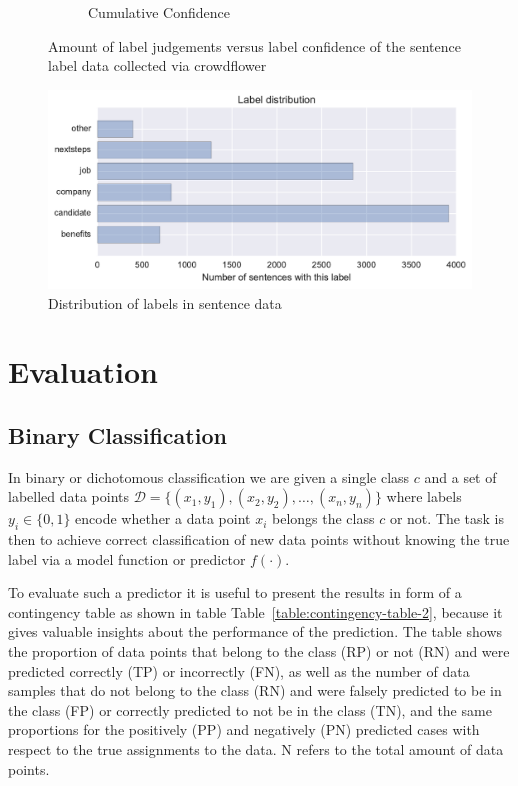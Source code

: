 \begin{figure}[h]
\begin{subfigure}[b]{0.43\textwidth}
        \caption{Cumulative Confidence}
        \label{fig:sentence-data-judgement-confidence-cumulative}
    \end{subfigure}
    \caption{Amount of label judgements versus label confidence of the sentence label data collected via crowdflower}
  \label{fig:sentence-data-judgements}
\end{figure}


\begin{figure}[h]
    \centering
    \includegraphics[width=\textwidth]{img/sentence-data-label-dist.pdf}
    \caption{Distribution of labels in sentence data}
  \label{fig:sentence-data-label-dist}
\end{figure}

\section{Evaluation}
\label{sec:evaluation}


\subsection{Binary Classification}
\label{sub:binary-classification}

In binary or dichotomous classification we are given a single class $c$ and a set of labelled data points $\mathcal{D} = \{ (x_1, y_1), (x_2, y_2), \ldots, (x_n, y_n) \}$ where labels $y_i \in \{0, 1\}$ encode whether a data point $x_i$ belongs the class $c$ or not. The task is then to achieve correct classification of new data points without knowing the true label via a model function or predictor $f(\cdot)$.

To evaluate such a predictor it is useful to present the results in form of a contingency table as shown in table Table~\ref{table:contingency-table-2}, because it gives valuable insights about the performance of the prediction. The table shows the proportion of data points that belong to the class (RP) or not (RN) and were predicted correctly (TP) or incorrectly (FN), as well as the number of data samples that do not belong to the class (RN) and were falsely predicted to be in the class (FP) or correctly predicted to not be in the class (TN), and the same proportions for the positively (PP) and negatively (PN) predicted cases with respect to the true assignments to the data. N refers to the total amount of data points.

